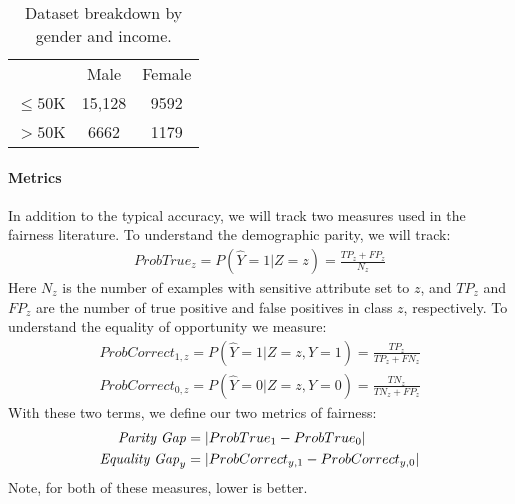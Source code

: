 \documentclass[sigconf,9pt]{acmart}
\begin{document}
\begin{table}[tb]
    \centering
    \begin{tabular}{ccc}
         & Male & Female  \\
        $\leq50$K & 15,128 & 9592 \\
        $>50$K & 6662 & 1179 \\
    \end{tabular}
    \vspace{3mm}
    \caption{Dataset breakdown by gender and income.}
    \vspace{-9mm}
    \label{tab:dataset}
\end{table}

\paragraph{Metrics}
In addition to the typical accuracy, we will track two measures used in the fairness literature.  To understand the demographic parity, we will track:
\begin{align}
    ProbTrue_z = P(\hat{Y}=1|Z=z) = \frac{TP_z + FP_z}{N_z}
\end{align}
Here $N_z$ is the number of examples with sensitive attribute set to $z$, and $TP_z$ and $FP_z$ are the number of true positive and false positives in class $z$, respectively.  
To understand the equality of opportunity we measure:
\begin{align}
    ProbCorrect_{1,z} = P(\hat{Y}=1|Z=z, Y=1) = \frac{TP_z}{TP_z + FN_z}\\
    ProbCorrect_{0,z} = P(\hat{Y}=0|Z=z, Y=0) = \frac{TN_z}{TN_z + FP_z}
\end{align}
With these two terms, we define our two metrics of fairness:
\begin{align}
    {\it Parity\;Gap} &= |ProbTrue_1 - ProbTrue_{0}|\\
    {\it Equality\;Gap}_y &= |ProbCorrect_{y,1} - ProbCorrect_{y,0}|
\end{align}
Note, for both of these measures, lower is better.
\end{document}

